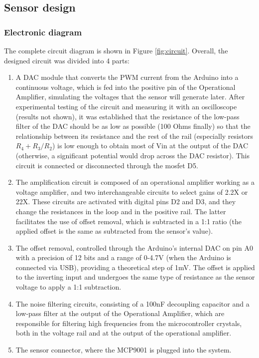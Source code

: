 \documentclass[conference]{IEEEtran}
\begin{document}
   \subsection{Sensor design}
      \subsubsection{Electronic diagram}
         The complete circuit diagram is shown in Figure \ref{fig:circuit}. Overall, the designed circuit was divided into 4 parts:

         \begin{enumerate}
            \item A DAC module that converts the PWM current from the Arduino into a continuous voltage, which is fed into the positive 
               pin of the Operational Amplifier, simulating the voltages that the sensor will generate later. After experimental testing of
               the circuit and measuring it with an oscilloscope (results not shown), it was established that the resistance of the low-pass
               filter of the DAC should be as low as possible (100 Ohms finally) so that the relationship between its resistance and the
               rest of the rail (especially resistors $R_4 + {R_3} / {R_2}$) is low enough to obtain most of Vin at the output of the
               DAC (otherwise, a significant potential would drop across the DAC resistor). This circuit is connected or disconnected
               through the mosfet D5.

            \item The amplification circuit is composed of an operational amplifier working as a voltage amplifier, and two interchangeable
               circuits to select gains of 2.2X or 22X. These circuits are activated with digital pins D2 and D3, and they change the resistances
               in the loop and in the positive rail. The latter facilitates the use of offset removal, which is subtracted in a 1:1 ratio
               (the applied offset is the same as subtracted from the sensor's value).

            \item The offset removal, controlled through the Arduino's internal DAC on pin A0 with a precision of 12 bits and a range of 0-4.7V
               (when the Arduino is connected via USB), providing a theoretical step of 1mV. The offset is applied to the inverting input and undergoes
               the same type of resistance as the sensor voltage to apply a 1:1 subtraction.

            \item The noise filtering circuits, consisting of a 100nF decoupling capacitor and a low-pass filter at the output of the Operational
               Amplifier, which are responsible for filtering high frequencies from the microcontroller crystals, both in the voltage rail and at
               the output of the operational amplifier.

            \item The sensor connector, where the MCP9001 is plugged into the system.
         \end{enumerate}
\end{document}
